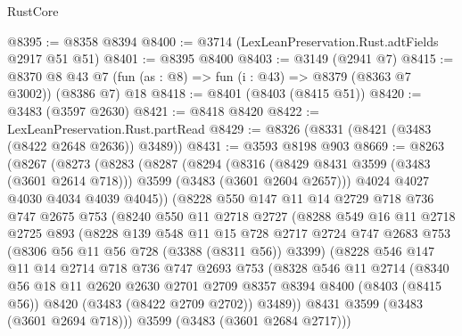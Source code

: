 \begin{lexlean}{RustCore}
\begin{coremodule}
@8395 := @8358 @8394
@8400 := @3714 (LexLeanPreservation.Rust.adtFields @2917 @51 @51)
@8401 := @8395 @8400
@8403 := @3149 (@2941 @7)
@8415 := @8370 @8 @43 @7 (fun (as : @8) => fun (i : @43) => @8379 (@8363 @7 @3002)) (@8386 @7) @18
@8418 := @8401 (@8403 (@8415 @51))
@8420 := @3483 (@3597 @2630)
@8421 := @8418 @8420
@8422 := LexLeanPreservation.Rust.partRead
@8429 := @8326 (@8331 (@8421 (@3483 (@8422 @2648 @2636)) @3489))
@8431 := @3593 @8198 @903
@8669 := @8263
    (@8267
      (@8273
        (@8283
          (@8287
            (@8294
              (@8316
                (@8429 @8431 @3599 (@3483 (@3601 @2614 @718)))
                @3599
                (@3483 (@3601 @2604 @2657)))
              @4024
              @4027
              @4030
              @4034
              @4039
              @4045))
          (@8228
            @550
            @147
            @11
            @14
            @2729
            @718
            @736
            @747
            @2675
            @753
            (@8240
              @550
              @11
              @2718
              @2727
              (@8288
                @549
                @16
                @11
                @2718
                @2725
                @893
                (@8228
                  @139
                  @548
                  @11
                  @15
                  @728
                  @2717
                  @2724
                  @747
                  @2683
                  @753
                  (@8306 @56 @11 @56 @728 (@3388 (@8311 @56)) @3399)
                  (@8228
                    @546
                    @147
                    @11
                    @14
                    @2714
                    @718
                    @736
                    @747
                    @2693
                    @753
                    (@8328
                      @546
                      @11
                      @2714
                      (@8340
                        @56
                        @18
                        @11
                        @2620
                        @2630
                        @2701
                        @2709
                        @8357
                        @8394
                        @8400
                        (@8403 (@8415 @56))
                        @8420
                        (@3483 (@8422 @2709 @2702))
                        @3489))
                    @8431
                    @3599
                    (@3483 (@3601 @2694 @718)))
                  @3599
                  (@3483 (@3601 @2684 @2717)))

\end{coremodule}
\end{lexlean}
